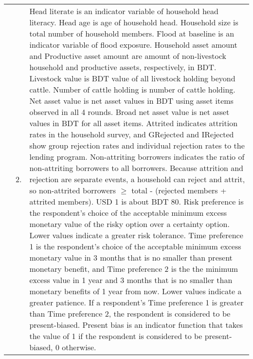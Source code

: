 \begin{table}
\begin{minipage}[t]{14cm}
\begin{tabular}{>{\hfill\scriptsize}p{1cm}<{}>{\hfill\scriptsize}p{.25cm}<{}>{\scriptsize}p{12cm}<{\hfill}}
& 2. & \textsf{Head literate} is an indicator variable of household head literacy. \textsf{Head age} is age of household head. \textsf{Household size} is total number of household members. \textsf{Flood at baseline} is an indicator variable of flood exposure. \textsf{Household asset amount} and \textsf{Productive asset amount} are amount of non-livestock household and productive assets, respectively, in BDT. \textsf{Livestock value} is BDT value of all livestock holding beyond cattle. \textsf{Number of cattle holding} is number of cattle holding. \textsf{Net asset value} is net asset values in BDT using asset items observed in all 4 rounds. \textsf{Broad net asset value} is net asset values in BDT for all asset items. \textsf{Attrited} indicates attrition rates in the household survey, and \textsf{GRejected} and \textsf{IRejected} show group rejection rates and individual rejection rates to the lending program. \textsf{Non-attriting borrowers} indicates the ratio of non-attriting borrowers to all borrowers. Because attrition and rejection are separate events, a household can reject and attrit, so non-attrited borrowers $\geqslant$ total - (rejected members + attrited members). USD 1 is about BDT 80. \textsf{Risk preference} is the respondent's choice of the acceptable minimum excess monetary value of the risky option over a certainty option. Lower values indicate a greater risk tolerance. \textsf{Time preference 1} is the respondent's choice of the acceptable minimum excess monetary value in 3 months that is no smaller than present monetary benefit, and \textsf{Time preference 2} is the the minimum excess value in 1 year and 3 months that is no smaller than monetary benefits of 1 year from now. Lower values indicate a greater patience. If a respondent's \textsf{Time preference 1} is greater than \textsf{Time preference 2}, the respondent is considered to be present-biased. \textsf{Present bias} is an indicator function that takes the value of 1 if the respondent is considered to be present-biased, 0 otherwise.%
\end{tabular}
\end{minipage}
\end{table}

